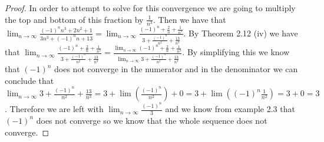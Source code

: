 \documentclass[11pt]{article}
\theoremstyle{definition}
\begin{document}
\begin{proof}
In order to attempt to solve for this convergence we are going to multiply the top and bottom of this fraction by $\frac{1}{n^3}.$ Then we have that $\lim_{n\rightarrow \infty}\frac{(-1)^n n^3 + 2 n^2 + 1}{3 n^3 + (-1)^n n + 13} = \lim_{n\rightarrow \infty} \frac{(-1)^n + \frac{2}{n} + \frac{1}{n^3}}{3 + \frac{(-1)^n}{n^2} + \frac{13}{n^3}}$. By Theorem 2.12 (iv) we have that $\lim_{n\rightarrow \infty} \frac{(-1)^n + \frac{2}{n} + \frac{1}{n^3}}{3 + \frac{(-1)^n}{n^2} + \frac{13}{n^3}} = \frac{\lim_{n\rightarrow \infty} (-1)^n + \frac{2}{n} + \frac{1}{n^3}}{\lim_{n\rightarrow \infty}3 + \frac{(-1)^n}{n^2} + \frac{13}{n^3}}$. By simplifying this we know that $(-1)^n$ does not converge in the numerator and in the denominator we can conclude that $\lim_{n\rightarrow \infty}3 + \frac{(-1)^n}{n^2} + \frac{13}{n^3} = 3 + \lim(\frac{(-1)^n}{n^2}) + 0 = 3 + \lim((-1)^n\frac{1}{n^2}) = 3+ 0 = 3$. Therefore we are left with $\lim_{n\rightarrow \infty} \frac{(-1)^n}{3}$ and we know from example 2.3 that $(-1)^n$ does not converge so we know that the whole sequence does not converge.
\end{proof}
\end{document}
